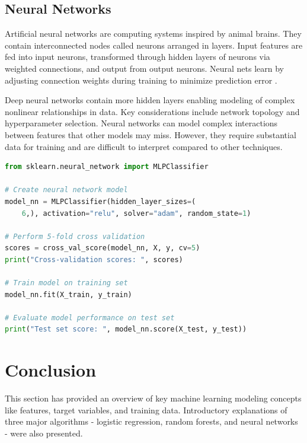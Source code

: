 \subsection{Neural Networks}

Artificial neural networks are computing systems inspired by animal brains. They contain interconnected nodes called neurons arranged in layers. Input features are fed into input neurons, transformed through hidden layers of neurons via weighted connections, and output from output neurons. Neural nets learn by adjusting connection weights during training to minimize prediction error \cite{picton1994neural}.

Deep neural networks contain more hidden layers enabling modeling of complex nonlinear relationships in data. Key considerations include network topology and hyperparameter selection. Neural networks can model complex interactions between features that other models may miss. However, they require substantial data for training and are difficult to interpret compared to other techniques.


\begin{lstlisting}[language=Python]
from sklearn.neural_network import MLPClassifier

# Create neural network model
model_nn = MLPClassifier(hidden_layer_sizes=(
	6,), activation="relu", solver="adam", random_state=1)

# Perform 5-fold cross validation
scores = cross_val_score(model_nn, X, y, cv=5)
print("Cross-validation scores: ", scores)

# Train model on training set
model_nn.fit(X_train, y_train)

# Evaluate model performance on test set
print("Test set score: ", model_nn.score(X_test, y_test))

\end{lstlisting}

\section{Conclusion}
\label{sec:model:conclusion}



This section has provided an overview of key machine learning modeling concepts like features, target variables, and training data. Introductory explanations of three major algorithms - logistic regression, 
random forests, and neural networks - were also presented. 
